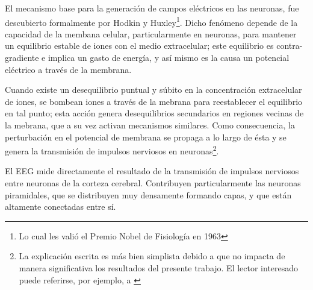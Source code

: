 

El mecanismo base para la generación de campos eléctricos en las neuronas, fue descubierto 
formalmente por Hodkin y Huxley\footnote{Lo cual les valió el
Premio Nobel de Fisiología en 1963}. Dicho fenómeno depende de la capacidad de la membana celular, 
particularmente en neuronas, para mantener un equilibrio estable de iones con el medio extracelular; 
este equilibrio es contra-gradiente e implica un gasto de energía, y así mismo es la causa un 
potencial eléctrico a través de la membrana.

Cuando existe un desequilibrio puntual y súbito en la concentración extracelular de iones, se 
bombean iones a través de la mebrana para reestablecer el equilibrio en tal punto; esta acción 
genera desequilibrios secundarios en regiones vecinas de la mebrana, que a su vez activan mecanismos 
similares. Como consecuencia, la perturbación en el potencial de membrana se propaga 
a lo largo de ésta y se genera la transmisión de impulsos nerviosos en neuronas\footnote{La explicación
escrita es más bien simplista debido a que no impacta de manera significativa los resultados del presente
trabajo. El lector interesado puede referirse, por ejemplo, a \cite{Ermentrout10}}.

El EEG mide directamente el resultado de la transmisión de impulsos nerviosos entre neuronas de la
corteza cerebral. Contribuyen particularmente las neuronas piramidales, que se distribuyen muy densamente
formando capas, y que están altamente conectadas entre sí.


